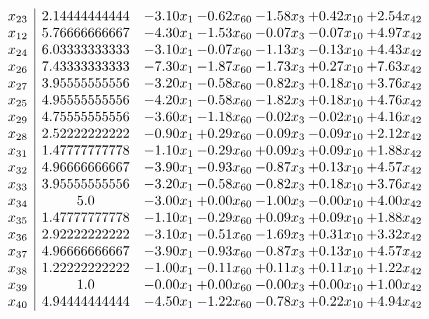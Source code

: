 \documentclass[8pt]{article}
\begin{document}
\[\begin{array}{c| c c@{\hskip 2pt} c@{\hskip 2pt} c@{\hskip 2pt} c@{\hskip 2pt} c@{\hskip 2pt} }
 x_{23}   &  2.14444444444 & -3.10 x_{1} & -0.62 x_{60} & -1.58 x_{3} & +  0.42 x_{10} & +  2.54 x_{42}\\
 x_{12}   &  5.76666666667 & -4.30 x_{1} & -1.53 x_{60} & -0.07 x_{3} & -0.07 x_{10} & +  4.97 x_{42}\\
 x_{24}   &  6.03333333333 & -3.10 x_{1} & -0.07 x_{60} & -1.13 x_{3} & -0.13 x_{10} & +  4.43 x_{42}\\
 x_{26}   &  7.43333333333 & -7.30 x_{1} & -1.87 x_{60} & -1.73 x_{3} & +  0.27 x_{10} & +  7.63 x_{42}\\
 x_{27}   &  3.95555555556 & -3.20 x_{1} & -0.58 x_{60} & -0.82 x_{3} & +  0.18 x_{10} & +  3.76 x_{42}\\
 x_{25}   &  4.95555555556 & -4.20 x_{1} & -0.58 x_{60} & -1.82 x_{3} & +  0.18 x_{10} & +  4.76 x_{42}\\
 x_{29}   &  4.75555555556 & -3.60 x_{1} & -1.18 x_{60} & -0.02 x_{3} & -0.02 x_{10} & +  4.16 x_{42}\\
 x_{28}   &  2.52222222222 & -0.90 x_{1} & +  0.29 x_{60} & -0.09 x_{3} & -0.09 x_{10} & +  2.12 x_{42}\\
 x_{31}   &  1.47777777778 & -1.10 x_{1} & -0.29 x_{60} & +  0.09 x_{3} & +  0.09 x_{10} & +  1.88 x_{42}\\
 x_{32}   &  4.96666666667 & -3.90 x_{1} & -0.93 x_{60} & -0.87 x_{3} & +  0.13 x_{10} & +  4.57 x_{42}\\
 x_{33}   &  3.95555555556 & -3.20 x_{1} & -0.58 x_{60} & -0.82 x_{3} & +  0.18 x_{10} & +  3.76 x_{42}\\
 x_{34}   &  5.0 & -3.00 x_{1} & +  0.00 x_{60} & -1.00 x_{3} & -0.00 x_{10} & +  4.00 x_{42}\\
 x_{35}   &  1.47777777778 & -1.10 x_{1} & -0.29 x_{60} & +  0.09 x_{3} & +  0.09 x_{10} & +  1.88 x_{42}\\
 x_{36}   &  2.92222222222 & -3.10 x_{1} & -0.51 x_{60} & -1.69 x_{3} & +  0.31 x_{10} & +  3.32 x_{42}\\
 x_{37}   &  4.96666666667 & -3.90 x_{1} & -0.93 x_{60} & -0.87 x_{3} & +  0.13 x_{10} & +  4.57 x_{42}\\
 x_{38}   &  1.22222222222 & -1.00 x_{1} & -0.11 x_{60} & +  0.11 x_{3} & +  0.11 x_{10} & +  1.22 x_{42}\\
 x_{39}   &  1.0 & -0.00 x_{1} & +  0.00 x_{60} & -0.00 x_{3} & +  0.00 x_{10} & +  1.00 x_{42}\\
 x_{40}   &  4.94444444444 & -4.50 x_{1} & -1.22 x_{60} & -0.78 x_{3} & +  0.22 x_{10} & +  4.94 x_{42}\\

\end{array}\]
\end{document}
